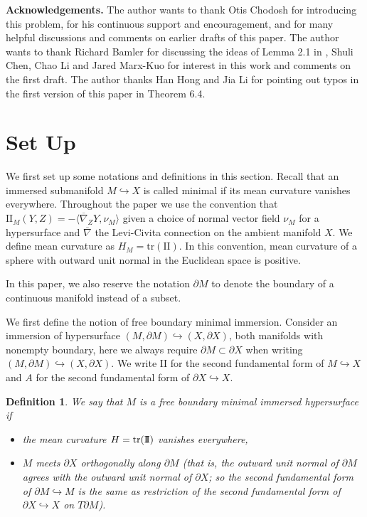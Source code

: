 \documentclass[12pt]{amsart}
\newcommand{\sff}{\mathrm{I\!I}}
\newcommand{\p}{\partial}
\newtheorem{definition}[theorem]{Definition}
\numberwithin{equation}{section}
\begin{document}
	\textbf{Acknowledgements.} The author wants to thank Otis Chodosh for introducing this problem, for his continuous support and encouragement, and for many helpful discussions and comments on earlier drafts of this paper. The author wants to thank Richard Bamler for discussing the ideas of Lemma 2.1 in \cite{BamleZhang2015-HeatKernelCurvature}, Shuli Chen, Chao Li and Jared Marx-Kuo for interest in this work and comments on  the first draft. The author thanks Han Hong and Jia Li for pointing out typos in the first version of this paper in Theorem 6.4.









	\section{Set Up}\label{setup}

    We first set up some notations and definitions in this section.
    Recall that an immersed submanifold $M \hookrightarrow X$ is called minimal if its mean curvature vanishes everywhere. Throughout the paper we use the convention that $\sff_M(Y,Z)=-\langle \overline{\nabla}_Z Y, \nu_{M}\rangle$ given a choice of normal vector field $\nu_M$ for a hypersurface and $\overline{\nabla}$ the Levi-Civita connection on the ambient manifold $X$. We define mean curvature as $H_M=\text{tr}(\sff).$ In this convention, mean curvature of a sphere with outward unit normal in the Euclidean space is positive.

	In this paper, we also reserve the notation $\p M$ to denote the boundary of a continuous manifold instead of a subset.

    We first define the notion of free boundary minimal immersion. Consider an immersion of hypersurface $(M,\p M) \hookrightarrow (X,\p X)$, both manifolds with nonempty boundary, here we always require $\p M \subset \p X$ when writing $(M,\p M) \hookrightarrow (X,\p X)$. We write $\sff$ for the second fundamental form of $M \hookrightarrow X$  and $A$ for the second fundamental form of $\p X \hookrightarrow X$.  
    \begin{definition}
        We say that $M$ is a free boundary minimal immersed hypersurface if 
        \begin{itemize}
            \item the mean curvature $H=\trace(\sff)$ vanishes everywhere,
            \item $M$ meets $\p X$ orthogonally along $\p M$ (that is, the outward unit normal of $\p M$ agrees with the outward unit normal of $\p X$; so the second fundamental form of $\p M \hookrightarrow M$ is the same as restriction of the second fundamental form of $\p X \hookrightarrow X$ on $T\p M$).
        \end{itemize}
       
    \end{definition}
\end{document}
